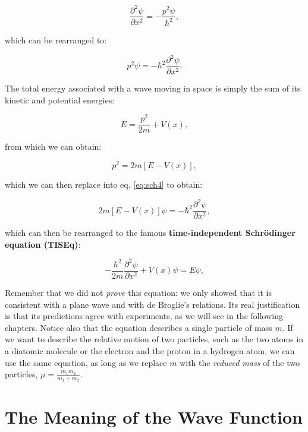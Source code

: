 \documentclass[
  english,
  9pt,
]{extbook}
\theoremstyle{definition}
\theoremstyle{definition}
\theoremstyle{definition}
\theoremstyle{definition}
\theoremstyle{remark}
\begin{document}
\begin{equation}
\frac{\partial^2 \psi}{\partial x^2} = -\frac{p^2\psi}{\hbar^2},
\label{eq:sch3}
\end{equation}

which can be rearranged to:

\begin{equation}
p^2 \psi = -\hbar^2 \frac{\partial^2 \psi}{\partial x^2}.
\label{eq:sch4}
\end{equation}

The total energy associated with a wave moving in space is simply the sum of its kinetic and potential energies:

\begin{equation}
E = \frac {p^{2}}{2m} + V(x),
\label{eq:sch5}
\end{equation}

from which we can obtain:

\begin{equation}
p^2 = 2m[E - V(x)],
\label{eq:sch6}
\end{equation}

which we can then replace into eq. \eqref{eq:sch4} to obtain:

\begin{equation}
2m[E-V(x)]\psi = - \hbar^2 \frac{\partial^2 \psi}{\partial x^2},
\label{eq:sch7}
\end{equation}

which can then be rearranged to the famous \textbf{time-independent Schrödinger equation (TISEq)}:

\begin{equation}
- \frac{\hbar^2}{2m} \frac{\partial^2 \psi}{\partial x^2} + V(x) \psi = E\psi,
\label{eq:TISEq}
\end{equation}

Remember that we did not \emph{prove} this equation: we only showed that it is consistent with a plane wave and with de Broglie's relations. Its real justification is that its predictions agree with experiments, as we will see in the following chapters. Notice also that the equation describes a single particle of mass \(m\). If we want to describe the relative motion of two particles, such as the two atoms in a diatomic molecule or the electron and the proton in a hydrogen atom, we can use the same equation, as long as we replace \(m\) with the \emph{reduced mass} of the two particles, \(\mu = \frac{m_1 m_2}{m_1+m_2}\).

\section{The Meaning of the Wave Function}\label{BornInterpretation}
\end{document}
